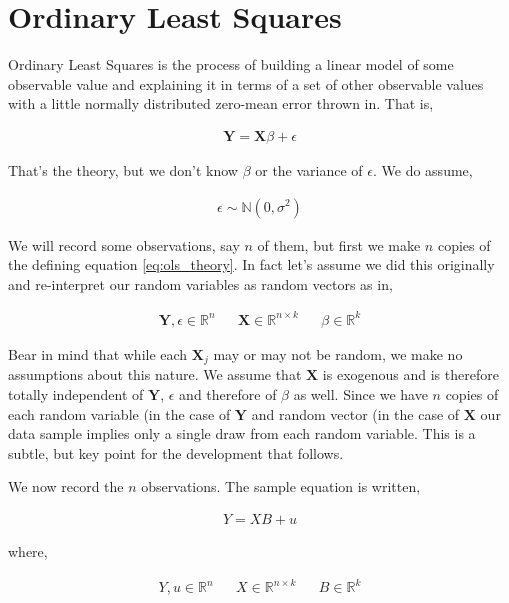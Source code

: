 \section{Ordinary Least Squares}

Ordinary Least Squares is the process of building a linear model of some observable
value and explaining it in terms of a set of other observable values with a little
normally distributed zero-mean error thrown in. That is,

\begin{align}
\label{eq:ols_theory}\mathbf{Y} = \mathbf{X}\beta + \epsilon
\end{align}

That's the theory, but we don't know $\beta$ or the variance of $\epsilon$. We do assume,

\begin{align*}
\epsilon \sim \mathbb{N}(0, \sigma^2)
\end{align*}

We will record some observations, say $n$ of them, but first we make $n$ copies of the defining equation \ref{eq:ols_theory}. In fact let's assume we did this originally and re-interpret our random variables as random vectors as in,

\begin{align*}
\mathbf{Y}, \epsilon \in \mathbb{R}^n && \mathbf{X} \in \mathbb{R}^{n \times k} && \beta \in \mathbb{R}^k
\end{align*}

Bear in mind that while each $\mathbf{X}_j$ may or may not be random, we make no assumptions about this nature. We assume that $\mathbf{X}$ is exogenous and is therefore totally independent of $\mathbf{Y}$, $\epsilon$ and therefore of $\beta$ as well. Since we have $n$ copies of each random variable (in the case of $\mathbf{Y}$ and random vector (in the case of $\mathbf{X}$ our data sample implies only a single draw from each random variable. This is a subtle, but key point for the development that follows.

We now record the $n$ observations. The sample equation is written,

\begin{align}
\label{eq:ols_sample}Y = XB + u
\end{align}

where,

\begin{align*}
Y, u \in \mathbb{R}^n && X \in \mathbb{R}^{n \times k} && B \in \mathbb{R}^k
\end{align*}


